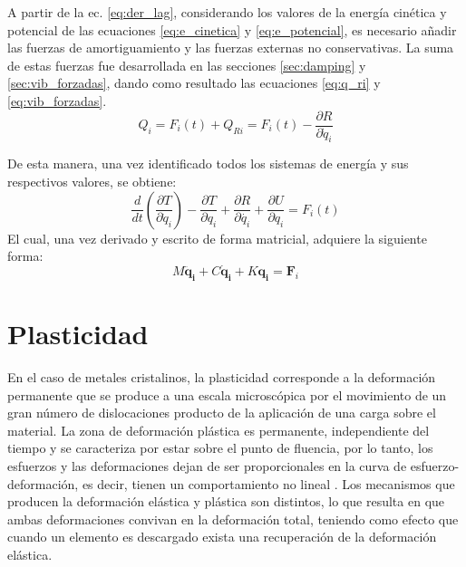 A partir de la ec. \ref{eq:der_lag}, considerando los valores de la energía cinética y potencial de las ecuaciones \ref{eq:e_cinetica} y \ref{eq:e_potencial}, es necesario añadir las fuerzas de amortiguamiento y las fuerzas externas no conservativas. La suma de estas fuerzas fue desarrollada en las secciones \ref{sec:damping} y \ref{sec:vib_forzadas}, dando como resultado las ecuaciones \ref{eq:q_ri} y \ref{eq:vib_forzadas}.
\begin{equation}\label{eq:lag_modelo}
	Q_i = F_i(t) + Q_{Ri} = F_i(t) - \frac{\partial R}{\partial \dot{q}_i} 
\end{equation}

De esta manera, una vez identificado todos los sistemas de energía y sus respectivos valores, se obtiene:
\begin{equation}
	\frac{d}{dt}\left(\frac{\partial T}{\partial \dot{q}_i}\right) - \frac{\partial T}{\partial q_i} + \frac{\partial R}{\partial \dot{q_i}} + \frac{\partial U}{\partial q_i} = F_i(t)
\end{equation}
El cual, una vez derivado y escrito de forma matricial, adquiere la siguiente forma:
\begin{equation}
	\mathit{M}\mathbf{\ddot{q}_i} + \mathit{C}\mathbf{\dot{q}_i} + \mathit{K}\mathbf{q_i} = \mathbf{F}_i
\end{equation}

\section{Plasticidad}

En el caso de metales cristalinos, la plasticidad corresponde a la deformación permanente que se produce a una escala microscópica por el movimiento de un gran número de dislocaciones producto de la aplicación de una carga sobre el material. La zona de deformación plástica es permanente, independiente del tiempo y se caracteriza por estar sobre el punto de fluencia, por lo tanto, los esfuerzos y las deformaciones dejan de ser proporcionales en la curva de esfuerzo-deformación, es decir, tienen un comportamiento no lineal . Los mecanismos que producen la deformación elástica y plástica son distintos, lo que resulta en que ambas deformaciones convivan en la deformación total, teniendo como efecto que cuando un elemento es descargado exista una recuperación de la deformación elástica. 


